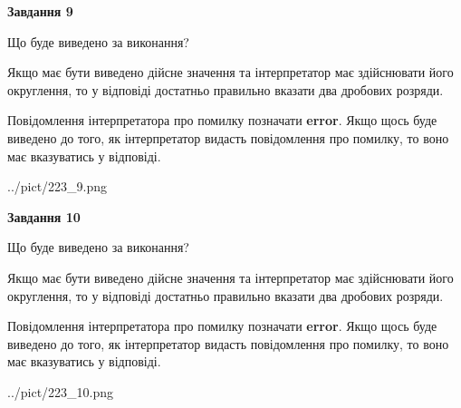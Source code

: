 \documentclass[12pt, ukrainian]{article}
\begin{document}
{\begin {Large}
{\begin {center}\textbf{Завдання 9}\end {center}}\par
Що буде виведено за виконання? \par

Якщо має бути виведено дійсне значення та інтерпретатор має здійснювати його округлення, 
то у відповіді достатньо правильно вказати два дробових розряди.

Повідомлення інтерпретатора про помилку позначати \textbf{error}.
Якщо щось буде виведено до того, як інтерпретатор видасть повідомлення про помилку, 
то воно має вказуватись у відповіді. \par

\begin{center}
	{../pict/223_9.png}
\end{center}
\newpage

{\begin {center}\textbf{Завдання 10}\end {center}}\par
Що буде виведено за виконання? \par

Якщо має бути виведено дійсне значення та інтерпретатор має здійснювати його округлення, 
то у відповіді достатньо правильно вказати два дробових розряди.

Повідомлення інтерпретатора про помилку позначати \textbf{error}.
Якщо щось буде виведено до того, як інтерпретатор видасть повідомлення про помилку, 
то воно має вказуватись у відповіді. \par

\begin{center}
	{../pict/223_10.png}
\end{center}
\newpage

\end {Large}}
\end{document}

